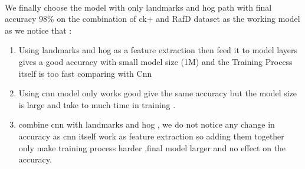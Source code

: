 \paragraph{}
We finally choose the model with only landmarks and hog path with final accuracy 98\% on the combination of ck+ and RafD dataset as the working model as we notice that :
\begin{enumerate}
	\item Using landmarks and hog as a feature extraction then feed it to model layers gives a good accuracy with small model size (1M) and the Training Process itself is too fast comparing with Cnn
	\item Using cnn model only works good give the same accuracy but the model size is large and take to much time in training .
	\item combine cnn with landmarks and hog , we do not notice any change in accuracy as cnn itself work as feature extraction so adding them together only make training process harder ,final model larger and no effect on the accuracy.
\end{enumerate} 